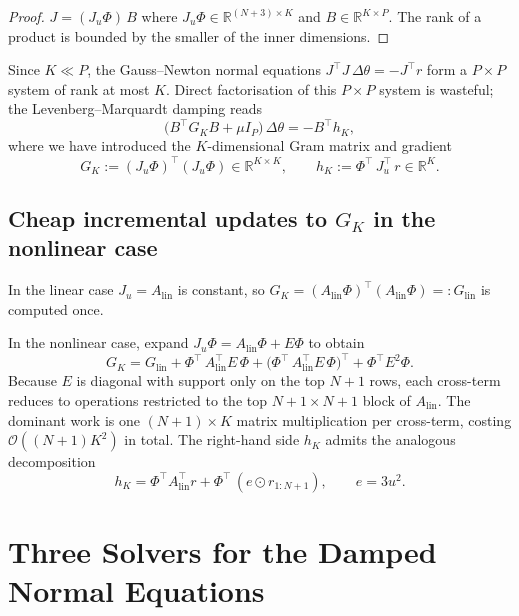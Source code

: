 \documentclass[11pt,a4paper]{article}
\newcommand{\R}{\mathbb{R}}
\newcommand{\Order}{\mathcal{O}}
\newcommand{\Alin}{A_{\mathrm{lin}}}
\newcommand{\Glin}{G_{\mathrm{lin}}}
\newcommand{\GK}{G_{K}}
\newcommand{\hK}{h_{K}}
\newcommand{\Bt}{B^{\!\top}}
\newcommand{\Jt}{J^{\!\top}}
\newcommand{\Phit}{\Phi^{\!\top}}
\newcommand{\Jut}{J_{u}^{\!\top}}
\begin{document}
\begin{proof}
$J = (J_{u}\Phi)\,B$ where $J_{u}\Phi\in\R^{(N+3)\times K}$ and $B\in\R^{K\times P}$.
The rank of a product is bounded by the smaller of the inner dimensions.
\end{proof}

\noindent Since $K\ll P$, the Gauss--Newton normal equations $\Jt J\, \Delta\theta
= -\Jt r$ form a $P\times P$ system of rank at most $K$. Direct factorisation of
this $P\times P$ system is wasteful; the Levenberg--Marquardt damping reads
\begin{equation}
\bigl(\Bt \GK B + \mu I_{P}\bigr)\,\Delta\theta = -\Bt \hK,
\label{eq:damped}
\end{equation}
where we have introduced the $K$-dimensional Gram matrix and gradient
\begin{equation}
\GK := (J_{u}\Phi)^{\!\top}\!(J_{u}\Phi) \in\R^{K\times K}, \qquad
\hK := \Phit\, \Jut\, r \in\R^{K}.
\label{eq:GKhK}
\end{equation}

\subsection{Cheap incremental updates to $\GK$ in the nonlinear case}

In the linear case $J_{u} = \Alin$ is constant, so
$\GK = (\Alin\Phi)^{\!\top}(\Alin\Phi) =: \Glin$ is computed once.

In the nonlinear case, expand
$J_{u}\Phi = \Alin\Phi + E\Phi$ to obtain
\begin{equation}
\GK = \Glin
   + \Phit\,\Alin^{\!\top} E\, \Phi
   + \bigl(\Phit\,\Alin^{\!\top} E\, \Phi\bigr)^{\!\top}
   + \Phit E^{2}\Phi.
\label{eq:GKupdate}
\end{equation}
Because $E$ is diagonal with support only on the top $N+1$ rows, each cross-term
reduces to operations restricted to the top $N+1\times N+1$ block of $\Alin$.
The dominant work is one $(N+1)\times K$ matrix multiplication per cross-term,
costing $\Order((N+1)K^{2})$ in total. The right-hand side $\hK$ admits the
analogous decomposition
\begin{equation}
\hK = \Phit\Alin^{\!\top} r + \Phit\,(e \odot r_{1:N+1}),
\qquad e = 3 u^{2}.
\end{equation}

\section{Three Solvers for the Damped Normal Equations}
\label{sec:methods}
\end{document}
